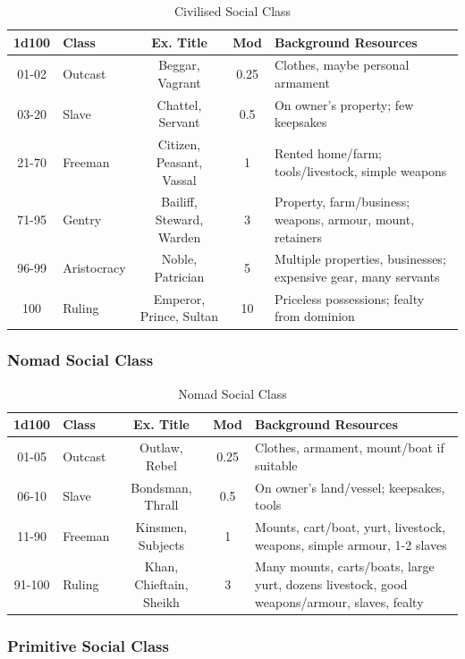 \documentclass[10pt]{article}
\begin{document}
\begin{longtable}{|c|l|c|c|p{7cm}|}
\caption{Civilised Social Class}
\label{tab:civilised-social-class}\\
\hline
\textbf{1d100} & \textbf{Class} & \textbf{Ex. Title} & \textbf{Mod} & \textbf{Background Resources} \\
\hline
01-02 & Outcast & Beggar, Vagrant & 0.25 & Clothes, maybe personal armament \\
\hline
03-20 & Slave & Chattel, Servant & 0.5 & On owner's property; few keepsakes \\
\hline
21-70 & Freeman & Citizen, Peasant, Vassal & 1 & Rented home/farm; tools/livestock, simple weapons \\
\hline
71-95 & Gentry & Bailiff, Steward, Warden & 3 & Property, farm/business; weapons, armour, mount, retainers \\
\hline
96-99 & Aristocracy & Noble, Patrician & 5 & Multiple properties, businesses; expensive gear, many servants \\
\hline
100 & Ruling & Emperor, Prince, Sultan & 10 & Priceless possessions; fealty from dominion \\
\hline
\end{longtable}

\subsubsection{Nomad Social Class}

\begin{longtable}{|c|l|c|c|p{7cm}|}
\caption{Nomad Social Class}
\label{tab:nomad-social-class}\\
\hline
\textbf{1d100} & \textbf{Class} & \textbf{Ex. Title} & \textbf{Mod} & \textbf{Background Resources} \\
\hline
01-05 & Outcast & Outlaw, Rebel & 0.25 & Clothes, armament, mount/boat if suitable \\
\hline
06-10 & Slave & Bondsman, Thrall & 0.5 & On owner's land/vessel; keepsakes, tools \\
\hline
11-90 & Freeman & Kinsmen, Subjects & 1 & Mounts, cart/boat, yurt, livestock, weapons, simple armour, 1-2 slaves \\
\hline
91-100 & Ruling & Khan, Chieftain, Sheikh & 3 & Many mounts, carts/boats, large yurt, dozens livestock, good weapons/armour, slaves, fealty \\
\hline
\end{longtable}

\subsubsection{Primitive Social Class}
\end{document}

